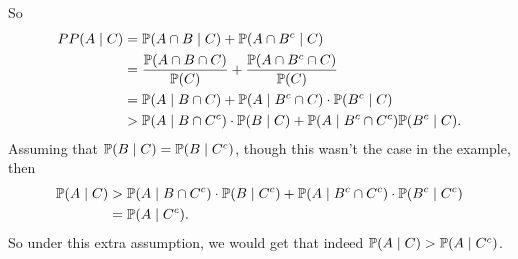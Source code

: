 \documentclass[a4paper]{scrreprt}
\begin{document}
\begin{example}
	So
	\begin{align*}
		PP(A \mid C) &= \mathbb{P}(A \cap B \mid C) + \mathbb{P}(A \cap B^c \mid C) \\
		&= \frac{\mathbb{P}(A \cap B \cap C)}{\mathbb{P}(C)} + \frac{\mathbb{P}(A \cap B^c \cap C)}{\mathbb{P}(C)} \\
		&= \mathbb{P}(A \mid B \cap C) + \mathbb{P}(A \mid B^c \cap C) \cdot \mathbb{P}(B^c \mid C) \\
		&> \mathbb{P}(A \mid B \cap C^c) \cdot \mathbb{P}(B \mid C) + \mathbb{P}(A \mid B^c \cap C^c) \mathbb{P}(B^c \mid C).
	\end{align*}
	Assuming that $\mathbb{P}(B \mid C) = \mathbb{P}(B \mid C^c)$, though this wasn't the case in the example, then
	\begin{align*}
		\mathbb{P}(A \mid C) &> \mathbb{P}(A \mid B \cap C^c) \cdot \mathbb{P}(B \mid C^c) + \mathbb{P}(A \mid B^c \cap C^c) \cdot \mathbb{P}(B^c \mid C^c) \\
		&= \mathbb{P}(A \mid C^c).
	\end{align*}
	So under this extra assumption, we would get that indeed $\mathbb{P}(A \mid C) > \mathbb{P}(A \mid C^c)$.
\end{example}
\end{document}
